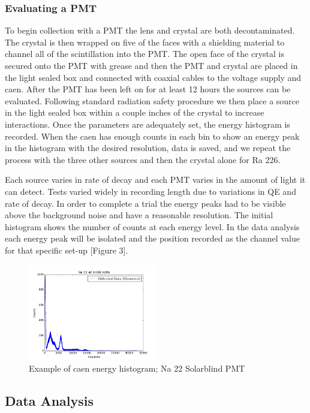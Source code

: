 \documentclass{article}
\begin{document}
\subsubsection{Evaluating a PMT}

To begin collection with a PMT the lens and crystal are both decontaminated. The crystal is then wrapped on five of the faces with a shielding material to channel all of the scintillation into the PMT. The open face of the crystal is secured onto the PMT with grease and then the PMT and crystal are placed in the light sealed box and connected with coaxial cables to the voltage supply and caen. After the PMT has been left on for at least 12 hours the sources can be evaluated. Following standard radiation safety procedure we then place a source in the light sealed box within a couple inches of the crystal to increase interactions. Once the parameters are adequately set, the energy histogram is recorded. When the caen has enough counts in each bin to show an energy peak in the histogram with the desired resolution, data is saved, and we repeat the process with the three other sources and then the crystal alone for Ra 226. 

Each source varies in rate of decay and each PMT varies in the amount of light it can detect. Tests varied widely in recording length due to variations in QE and rate of decay. In order to complete a trial the energy peaks had to be visible above the background noise and have a reasonable resolution. The initial histogram shows the number of counts at each energy level. In the data analysis each energy peak will be isolated and the position recorded as the channel value for that specific set-up [Figure 3]. 

\begin{figure}
  \centering
    \includegraphics[width=0.5\textwidth]{na.png}
  \caption{Example of caen energy histogram; Na 22 Solarblind PMT}
  \label{fig:workflowedge}
\end{figure} 


\subsection{Data Analysis}
\end{document}
